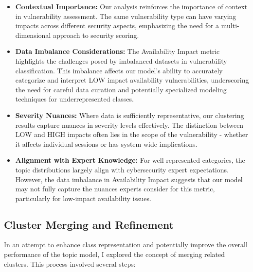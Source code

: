 \documentclass[12pt]{article}
\begin{document}
\begin{itemize}

	\item \textbf{Contextual Importance:} Our analysis reinforces the importance of context in
	      vulnerability assessment. The same vulnerability type can have varying impacts across
	      different security aspects, emphasizing the need for a multi-dimensional approach to
	      security scoring.

	\item \textbf{Data Imbalance Considerations:} The Availability Impact metric highlights the
	      challenges posed by imbalanced datasets in vulnerability classification. This imbalance
	      affects our model's ability to accurately categorize and interpret LOW impact availability
	      vulnerabilities, underscoring the need for careful data curation and potentially specialized
	      modeling techniques for underrepresented classes.

	\item \textbf{Severity Nuances:} Where data is sufficiently representative, our clustering
	      results capture nuances in severity levels effectively. The distinction between LOW and HIGH
	      impacts often lies in the scope of the vulnerability - whether it affects individual
	      sessions or has system-wide implications.

	\item \textbf{Alignment with Expert Knowledge:} For well-represented categories, the topic
	      distributions largely align with cybersecurity expert expectations. However, the data
	      imbalance in Availability Impact suggests that our model may not fully capture the nuances
	      experts consider for this metric, particularly for low-impact availability issues.

\end{itemize}

\subsection{Cluster Merging and Refinement}

In an attempt to enhance class representation and potentially improve the overall performance of the
topic model, I explored the concept of merging related clusters. This process involved several steps:
\end{document}
